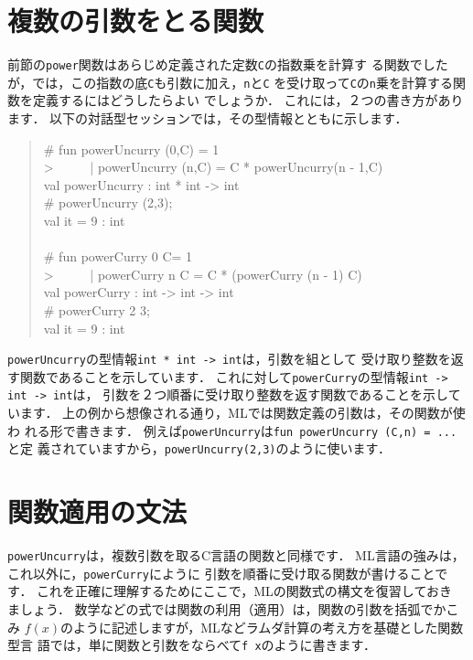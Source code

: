 \documentclass{jbook}
\begin{document}
\section{複数の引数をとる関数}
\label{sec:tutorialMultiargfun}

	前節の{\tt power}関数はあらじめ定義された定数{\tt C}の指数乗を計算す
る関数でしたが，では，この指数の底{\tt C}も引数に加え，{\tt n}と{\tt C}
を受け取って{\tt C}の{\tt n}乗を計算する関数を定義するにはどうしたらよい
でしょうか．
	これには，２つの書き方があります．
	以下の対話型セッションでは，その型情報とともに示します．
\begin{tt}
\begin{quote}
\# fun powerUncurry (0,C) = 1\\
> \ \ \ \ \ | powerUncurry (n,C) = C * powerUncurry(n - 1,C)\\
val powerUncurry : int * int -> int\\
\# powerUncurry (2,3);\\
val it = 9 : int\\
\ \\
\# fun powerCurry 0 C= 1\\
> \ \ \ \ \ | powerCurry n C = C * (powerCurry (n - 1) C)\\
val powerCurry : int -> int -> int\\
\# powerCurry 2 3;\\
val it = 9 : int
\end{quote}
\end{tt}
	{\tt powerUncurry}の型情報{\tt int * int -> int}は，引数を組として
受け取り整数を返す関数であることを示しています．
	これに対して{\tt powerCurry}の型情報{\tt int -> int -> int}は，
引数を２つ順番に受け取り整数を返す関数であることを示しています．
	上の例から想像される通り，MLでは関数定義の引数は，その関数が使わ
れる形で書きます．
	例えば{\tt powerUncurry}は{\tt fun powerUncurry (C,n) = ...}と定
義されていますから，{\tt powerUncurry(2,3)}のように使います．

\section{関数適用の文法}
\label{sec:tutorialApplysyntax}

	{\tt powerUncurry}は，複数引数を取るC言語の関数と同様です．
	ML言語の強みは，これ以外に，{\tt powerCurry}にように
引数を順番に受け取る関数が書けることです．
	これを正確に理解するためにここで，MLの関数式の構文を復習しておき
ましょう．
	数学などの式では関数の利用（適用）は，関数の引数を括弧でかこみ
$f(x)$のように記述しますが，MLなどラムダ計算の考え方を基礎とした関数型言
語では，単に関数と引数をならべて{\tt f x}のように書きます．
\end{document}
